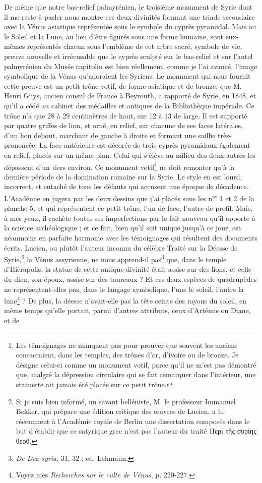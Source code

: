 \documentclass{article}
\begin{document}
De même que notre bas-relief palmyrénien, le troisième monument de Syrie dont il me reste à parler nous montre ces deux divinités formant une triade secondaire avec la Vénus asiatique représentée sous le symbole du cyprès pyramidal. Mais ici le Soleil et la Lune, au lieu d'être figurés sous une forme humaine, sont eux-mêmes représentés chacun sous l'emblème de cet arbre sacré, symbole de vie, preuve nouvelle et irrécusable que le cyprès sculpté sur le bas-relief et sur l'autel palmyrénien du Musée capitolin est bien réellement, comme je l'ai avancé, l'image symbolique de la Vénus qu'adoraient les Syriens. Le monument qui nous fournit cette preuve est un petit trône votif, de forme asiatique et de bronze, que M. Henri Guys, ancien consul de France à Beyrouth, a rapporté de Syrie, en 1848, et qu'il a cédé au cabinet des médailles et antiques de la Bibliothèque impériale. Ce trône n'a que 28 à 29 centimètres de haut, sur 12 à 13 de large. Il est supporté par quatre griffes de lion, et orné, en relief, sur chacune de ses faces latérales, d'un lion debout, marchant de gauche à droite et formant une saillie très-prononcée. La face antérieure est décorée de trois cyprès pyramidaux également en relief, placés sur un même plan. Celui qui s'élève au milieu des deux autres les dépassent d'un tiers environ. Ce monument votif\footnote{Les témoignages ne manquent pas pour prouver que souvent les anciens consacraient, dans les temples, des trônes d'or, d'ivoire ou de bronze. Je désigne celui-ci comme un monument votif, parce qu'il ne m'est pas démontré que, malgré la dépression circulaire qui se fait remarquer dans l'intérieur, une statuette ait jamais été placée sur ce petit trône.} ne doit remonter qu'à la dernière période de la domination romaine sur la Syrie. Le style en est lourd, incorrect, et entaché de tous les défauts qui accusent une époque de décadence. L'Académie en jugera par les deux dessins que j'ai placés sous les n°\textsuperscript{s} 1 et 2 de la planche 5, et qui représentent ce petit trône, l'un de face, l'autre de profil. Mais, à mes yeux, il rachète toutes ses imperfections par le fait nouveau qu'il apporte à la science archéologique ; et ce fait, bien qu'il soit unique jusqu'à ce jour, est néanmoins en parfaite harmonie avec les témoignages qui résultent des documents écrits. Lucien, ou plutôt l'auteur inconnu du célèbre Traité sur la Déesse de Syrie,\footnote{Si je suis bien informé, un savant helléniste, M. le professeur Immanuel Bekker, qui prépare une édition critique des œuvres de Lucien, a lu récemment à l'Académie royale de Berlin une dissertation composée dans le but d'établir que ce satyrique grec n'est pas l'auteur du traité \textgreek{Περὶ τῆς συρίης θεοῦ}.} la Vénus assyrienne, ne nous apprend-il pas\footnote{\emph{De Dea syria}, 31, 32 ; ed. Lehmann.} que, dans le temple d'Hiérapolis, la statue de cette antique divinité était assise sur des lions, et celle du dieu, son époux, assise sur des taureaux ? Et ces deux espèces de quadrupèdes ne représentent-elles pas, dans le langage symbolique, l'une le soleil, l'autre la lune\footnote{Voyez mes \emph{Recherches sur le culte de Vénus}, p. 220-227.} ? De plus, la déesse n'avait-elle pas la tête ceinte des rayons du soleil, en même temps qu'elle portait, parmi d'autres attributs, ceux d'Artémis ou Diane, et de 
\end{document}
